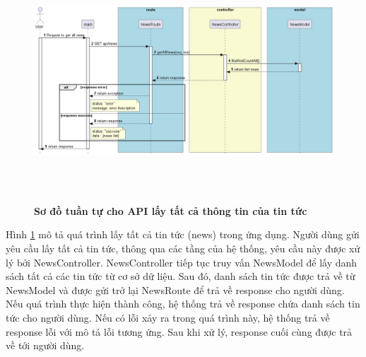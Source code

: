 \begin{figure}[H]
  \centering
  \includegraphics[width=16cm,height=9cm]{Images/server/sequence/server/getAllNews.png}
  \caption[Sơ đồ tuần tự cho API lấy tất cả thông tin của tin tức]{\bfseries \fontsize{12pt}{0pt}
  \selectfont Sơ đồ tuần tự cho API lấy tất cả thông tin của tin tức }
  \label{getAllNews} %
\end{figure}
Hình \ref{getAllNews} mô tả quá trình lấy tất cả tin tức (news) trong ứng dụng. Người dùng gửi yêu cầu lấy tất cả tin tức, thông qua các tầng của hệ thống, yêu cầu này được xử lý bởi NewsController. NewsController tiếp tục truy vấn NewsModel để lấy danh sách tất cả các tin tức từ cơ sở dữ liệu. Sau đó, danh sách tin tức được trả về từ NewsModel và được gửi trở lại NewsRoute để trả về response cho người dùng. Nếu quá trình thực hiện thành công, hệ thống trả về response chứa danh sách tin tức cho người dùng. Nếu có lỗi xảy ra trong quá trình này, hệ thống trả về response lỗi với mô tả lỗi tương ứng. Sau khi xử lý, response cuối cùng được trả về tới người dùng.


